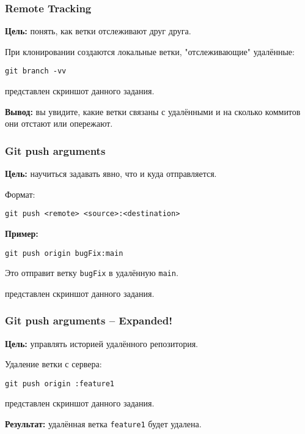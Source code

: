 \documentclass[a4paper,12pt]{report}
\begin{document}
\subsubsection{Remote Tracking}
\textbf{Цель:} понять, как ветки отслеживают друг друга.

При клонировании создаются локальные ветки, "отслеживающие" удалённые:
\begin{verbatim}
git branch -vv
\end{verbatim}

 представлен скриншот данного задания.

\textbf{Вывод:} вы увидите, какие ветки связаны с удалёнными и на сколько коммитов они отстают или опережают.

\subsubsection{Git push arguments}
\textbf{Цель:} научиться задавать явно, что и куда отправляется.

Формат:
\begin{verbatim}
git push <remote> <source>:<destination>
\end{verbatim}

\textbf{Пример:}
\begin{verbatim}
git push origin bugFix:main
\end{verbatim}

Это отправит ветку \texttt{bugFix} в удалённую \texttt{main}.

 представлен скриншот данного задания.

\subsubsection{Git push arguments -- Expanded!}
\textbf{Цель:} управлять историей удалённого репозитория.

Удаление ветки с сервера:
\begin{verbatim}
git push origin :feature1
\end{verbatim}

 представлен скриншот данного задания.

\textbf{Результат:} удалённая ветка \texttt{feature1} будет удалена.
\end{document}
